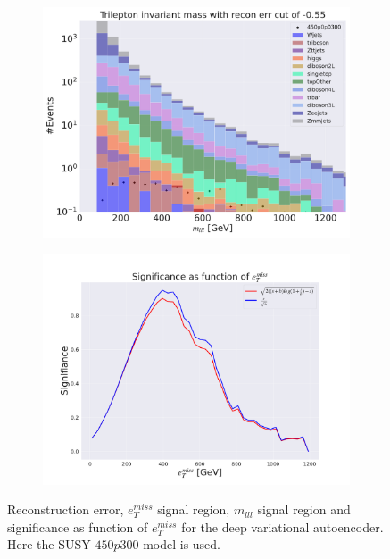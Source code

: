 \begin{figure}[H]
    \hfill
    \begin{subfigure}{.49\textwidth}
        \includegraphics[width=\textwidth]{Figures/VAE_testing/big/3lep/b_data_recon_big_rm3_feats_sig_450p0p0300_mlll_recon_errcut_-0.55.pdf}
        \caption{}
        \label{fig:VAE_3lep_big_mlll_450_3}
    \end{subfigure}
    \hfill   
    \begin{subfigure}{.49\textwidth}
        \includegraphics[width=\textwidth]{Figures/VAE_testing/big/3lep/significance_etmiss_450p0p0300_-0.5484574357785665.pdf}
        \caption{}
        \label{fig:VAE_3lep_big_signi_450_3}
    \end{subfigure}
    \hfill      
    \caption[3lep deep network | $450p300$ | VAE | 3]{Reconstruction error, $e_T^{miss}$ signal region, $m_{lll}$ signal region and significance as function of 
    $e_T^{miss}$ for the deep variational autoencoder. Here the SUSY $450p300$ model is used.}
    \label{fig:VAE_3lep_big_rec_sig_signi_450_3}
\end{figure}

